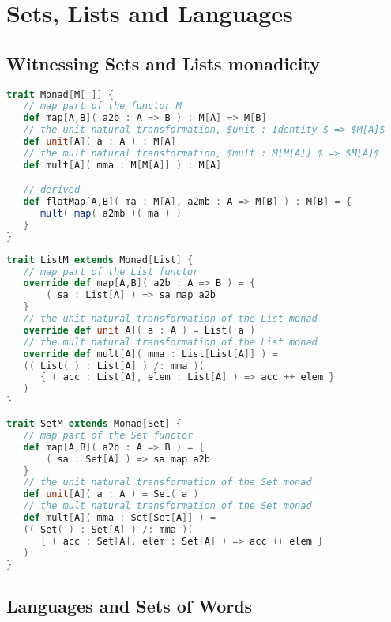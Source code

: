 \section{Sets, Lists and Languages}

\subsection{Witnessing Sets and Lists monadicity}

\begin{lstlisting}[language=Scala,mathescape=true]
trait Monad[M[_]] {
   // map part of the functor M
   def map[A,B]( a2b : A => B ) : M[A] => M[B]   
   // the unit natural transformation, $unit : Identity $ => $M[A]$
   def unit[A]( a : A ) : M[A]
   // the mult natural transformation, $mult : M[M[A]] $ => $M[A]$   
   def mult[A]( mma : M[M[A]] ) : M[A]

   // derived
   def flatMap[A,B]( ma : M[A], a2mb : A => M[B] ) : M[B] = {
      mult( map( a2mb )( ma ) )
   }
}
\end{lstlisting}

\break
\begin{lstlisting}[language=Scala,mathescape=true]
trait ListM extends Monad[List] {  
   // map part of the List functor
   override def map[A,B]( a2b : A => B ) = {
       ( sa : List[A] ) => sa map a2b
   }   
   // the unit natural transformation of the List monad
   override def unit[A]( a : A ) = List( a )
   // the mult natural transformation of the List monad
   override def mult[A]( mma : List[List[A]] ) =
   (( List( ) : List[A] ) /: mma )(
      { ( acc : List[A], elem : List[A] ) => acc ++ elem }
   )
}
\end{lstlisting}

\begin{lstlisting}[language=Scala,mathescape=true]
trait SetM extends Monad[Set] {
   // map part of the Set functor
   def map[A,B]( a2b : A => B ) = {
       ( sa : Set[A] ) => sa map a2b
   }
   // the unit natural transformation of the Set monad
   def unit[A]( a : A ) = Set( a )
   // the mult natural transformation of the Set monad
   def mult[A]( mma : Set[Set[A]] ) =
   (( Set( ) : Set[A] ) /: mma )(
      { ( acc : Set[A], elem : Set[A] ) => acc ++ elem }
   )
}
\end{lstlisting}

\subsection{Languages and Sets of Words}

